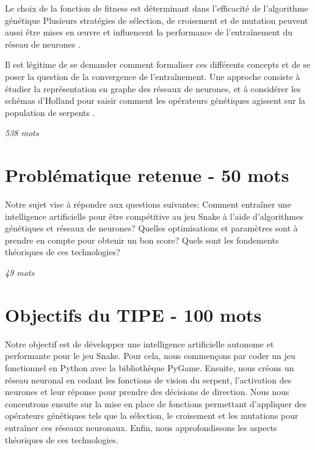 \documentclass[11pt,a4paper]{article}
\begin{document}
Le choix de la fonction de fitness est déterminant dans l’efficacité de l’algorithme génétique 
Plusieurs stratégies de sélection, de croisement et de mutation peuvent aussi être mises en œuvre et influencent la performance de l’entraînement du réseau de neurones \cite{snakeGameAiYeh2016}.

Il est légitime de se demander comment formaliser ces différents concepts et de se poser la question de la convergence de l’entraînement.
Une approche consiste à étudier la représentation en graphe des réseaux de neurones, et à considérer les schémas d'Holland pour saisir comment les opérateurs génétiques agissent sur la population de serpents \cite{davis1991handbookGeneticAlgorithms,whitley1994geneticAlgorithmTutorial}.



\textit{538 mots}

\section{Problématique retenue - 50 mots}

Notre sujet vise à répondre aux questions suivantes:
Comment entraîner une intelligence artificielle pour être compétitive au jeu Snake à l'aide d'algorithmes génétiques et réseaux de neurones?
Quelles optimisations et paramètres sont à prendre en compte pour obtenir un bon score?
Quels sont les fondements théoriques de ces technologies?

\textit{49 mots}

\section{Objectifs du TIPE - 100 mots}

Notre objectif est de développer une intelligence artificielle autonome et performante pour le jeu Snake.
Pour cela, nous commençons par coder un jeu fonctionnel en Python avec la bibliothèque PyGame. 
Ensuite, nous créons un réseau neuronal en codant les fonctions de vision du serpent, l'activation des neurones et leur réponse pour prendre des décisions de direction.
Nous nous concentrons ensuite sur la mise en place de fonctions permettant d'appliquer des opérateurs génétiques tels que la sélection, le croisement et les mutations pour entraîner ces réseaux neuronaux.
Enfin, nous approfondissons les aspects théoriques de ces technologies.
\end{document}
